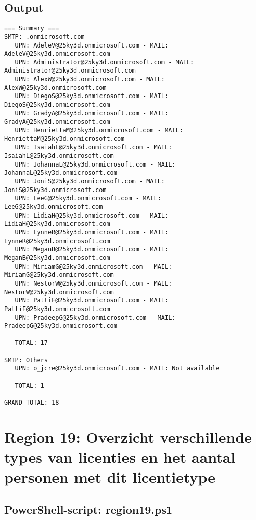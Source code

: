 \clearpage

\subsection{Output}

\begin{scriptsize}
    \begin{verbatim}
=== Summary ===
SMTP: .onmicrosoft.com
   UPN: AdeleV@25ky3d.onmicrosoft.com - MAIL: AdeleV@25ky3d.onmicrosoft.com
   UPN: Administrator@25ky3d.onmicrosoft.com - MAIL: Administrator@25ky3d.onmicrosoft.com
   UPN: AlexW@25ky3d.onmicrosoft.com - MAIL: AlexW@25ky3d.onmicrosoft.com
   UPN: DiegoS@25ky3d.onmicrosoft.com - MAIL: DiegoS@25ky3d.onmicrosoft.com
   UPN: GradyA@25ky3d.onmicrosoft.com - MAIL: GradyA@25ky3d.onmicrosoft.com
   UPN: HenriettaM@25ky3d.onmicrosoft.com - MAIL: HenriettaM@25ky3d.onmicrosoft.com
   UPN: IsaiahL@25ky3d.onmicrosoft.com - MAIL: IsaiahL@25ky3d.onmicrosoft.com
   UPN: JohannaL@25ky3d.onmicrosoft.com - MAIL: JohannaL@25ky3d.onmicrosoft.com
   UPN: JoniS@25ky3d.onmicrosoft.com - MAIL: JoniS@25ky3d.onmicrosoft.com
   UPN: LeeG@25ky3d.onmicrosoft.com - MAIL: LeeG@25ky3d.onmicrosoft.com
   UPN: LidiaH@25ky3d.onmicrosoft.com - MAIL: LidiaH@25ky3d.onmicrosoft.com
   UPN: LynneR@25ky3d.onmicrosoft.com - MAIL: LynneR@25ky3d.onmicrosoft.com
   UPN: MeganB@25ky3d.onmicrosoft.com - MAIL: MeganB@25ky3d.onmicrosoft.com
   UPN: MiriamG@25ky3d.onmicrosoft.com - MAIL: MiriamG@25ky3d.onmicrosoft.com
   UPN: NestorW@25ky3d.onmicrosoft.com - MAIL: NestorW@25ky3d.onmicrosoft.com
   UPN: PattiF@25ky3d.onmicrosoft.com - MAIL: PattiF@25ky3d.onmicrosoft.com
   UPN: PradeepG@25ky3d.onmicrosoft.com - MAIL: PradeepG@25ky3d.onmicrosoft.com
   ---
   TOTAL: 17

SMTP: Others
   UPN: o_jcre@25ky3d.onmicrosoft.com - MAIL: Not available
   ---
   TOTAL: 1
---
GRAND TOTAL: 18
    \end{verbatim}
\end{scriptsize}

\clearpage

\section{Region 19: Overzicht verschillende types van licenties en het aantal personen met dit licentietype}

\subsection{PowerShell-script: region19.ps1}

